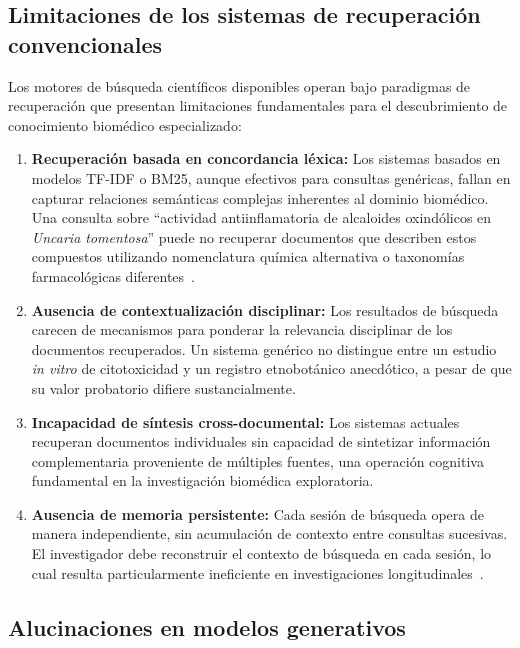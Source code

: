 \subsection{Limitaciones de los sistemas de recuperación convencionales}
\label{subsec:retrieval_limitations}

Los motores de búsqueda científicos disponibles operan bajo paradigmas de recuperación que presentan limitaciones fundamentales para el descubrimiento de conocimiento biomédico especializado:

\begin{enumerate}[label=(\alph*)]
  \item \textbf{Recuperación basada en concordancia léxica:} Los sistemas basados en modelos TF-IDF o BM25, aunque efectivos para consultas genéricas, fallan en capturar relaciones semánticas complejas inherentes al dominio biomédico. Una consulta sobre ``actividad antiinflamatoria de alcaloides oxindólicos en \textit{Uncaria tomentosa}'' puede no recuperar documentos que describen estos compuestos utilizando nomenclatura química alternativa o taxonomías farmacológicas diferentes~\cite{wang2018clinical}.

  \item \textbf{Ausencia de contextualización disciplinar:} Los resultados de búsqueda carecen de mecanismos para ponderar la relevancia disciplinar de los documentos recuperados. Un sistema genérico no distingue entre un estudio \textit{in vitro} de citotoxicidad y un registro etnobotánico anecdótico, a pesar de que su valor probatorio difiere sustancialmente.

  \item \textbf{Incapacidad de síntesis cross-documental:} Los sistemas actuales recuperan documentos individuales sin capacidad de sintetizar información complementaria proveniente de múltiples fuentes, una operación cognitiva fundamental en la investigación biomédica exploratoria.

  \item \textbf{Ausencia de memoria persistente:} Cada sesión de búsqueda opera de manera independiente, sin acumulación de contexto entre consultas sucesivas. El investigador debe reconstruir el contexto de búsqueda en cada sesión, lo cual resulta particularmente ineficiente en investigaciones longitudinales~\cite{karpukhin2020dense}.
\end{enumerate}

\subsection{Alucinaciones en modelos generativos}
\label{subsec:hallucinations}

